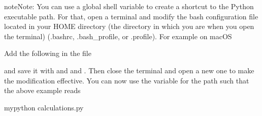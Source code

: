 \documentclass[letterpaper,10pt,english]{sphinxmanual}
\begin{document}
\begin{sphinxadmonition}{note}{Note:}
\sphinxAtStartPar
You can use a global shell variable to create a shortcut to the Python executable path.
For that, open a terminal and modify the bash configuration file located in your
HOME directory (the directory in which you are when you open the terminal)
(.bashrc, .bash\_profile, or .profile). For example on macOS

\begin{sphinxVerbatim}[commandchars=\\\{\}]
 
\end{sphinxVerbatim}

\sphinxAtStartPar
Add the following in the file

\begin{sphinxVerbatim}[commandchars=\\\{\}]
 
\end{sphinxVerbatim}

\sphinxAtStartPar
and save it with  and  and .
Then close the terminal and open a new one to make the modification effective.
You can now use the variable 
for the path such that the above example reads

\begin{sphinxVerbatim}[commandchars=\\\{\}]
\PYGZdl{}mypython calculations.py
\end{sphinxVerbatim}
\end{sphinxadmonition}
\end{document}
